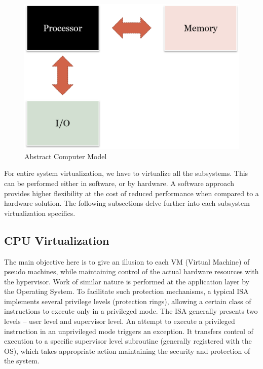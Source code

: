\setlength{\belowcaptionskip}{-10pt}

\begin{figure}[H]
  \centering
  \includegraphics[scale=0.8]{figures/Mem_IO_CPU.png}
  \caption{Abstract Computer Model}
  \label{fig:mem_io}
\end{figure}
For entire system virtualization, we have to virtualize all the subsystems. This can be performed either in software, or by hardware. A software approach provides higher flexibility at the cost of reduced performance when compared to a hardware solution. The following subsections delve further into each subsystem virtualization specifics.

\subsection{CPU Virtualization}
The main objective here is to give an illusion to each VM (Virtual Machine) of pseudo machines, while maintaining control of the actual hardware resources with the hypervisor. Work of similar nature is performed at the application layer by the Operating System. To facilitate such protection mechanisms, a typical ISA implements several privilege levels (protection rings), allowing a certain class of instructions to execute only in a privileged mode. The ISA generally presents two levels -- user level and supervisor level. An attempt to execute a privileged instruction in an unprivileged mode triggers an exception. It transfers control of execution to a specific supervisor level subroutine (generally registered with the OS), which takes appropriate action maintaining the security and protection of the system.

\setlength{\belowcaptionskip}{-10pt}

